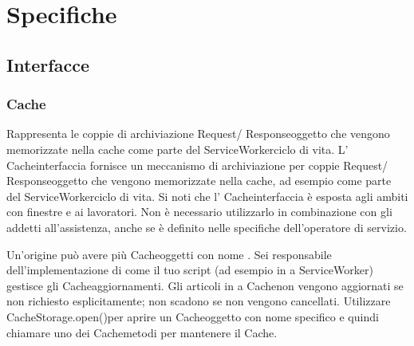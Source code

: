 \documentclass[italian]{article}
\begin{document}
\section{Specifiche}
\subsection{Interfacce}
\subsubsection{Cache}
Rappresenta le coppie di archiviazione Request/ Responseoggetto che vengono memorizzate nella cache come parte del ServiceWorkerciclo di vita.
L' Cacheinterfaccia fornisce un meccanismo di archiviazione per coppie Request/ Responseoggetto che vengono memorizzate nella cache, ad esempio come parte del ServiceWorkerciclo di vita. Si noti che l' Cacheinterfaccia è esposta agli ambiti con finestre e ai lavoratori. Non è necessario utilizzarlo in combinazione con gli addetti all'assistenza, anche se è definito nelle specifiche dell'operatore di servizio.

Un'origine può avere più Cacheoggetti con nome . Sei responsabile dell'implementazione di come il tuo script (ad esempio in a ServiceWorker) gestisce gli Cacheaggiornamenti. Gli articoli in a Cachenon vengono aggiornati se non richiesto esplicitamente; non scadono se non vengono cancellati. Utilizzare CacheStorage.open()per aprire un Cacheoggetto con nome specifico e quindi chiamare uno dei Cachemetodi per mantenere il Cache.
\end{document}
